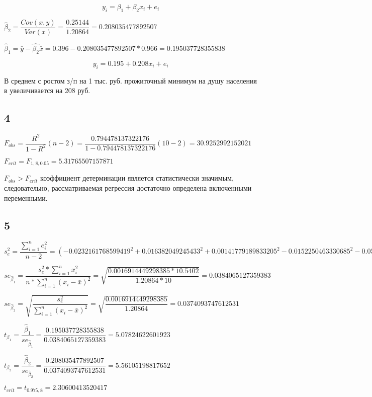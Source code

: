 \documentclass[12pt,a4paper, oneside]{extreport}
\begin{document}
$$y_i = \beta_1 + \beta_2 x_i + e_i  $$


$\hat{\beta}_2 = \dfrac{Cov(x,y)}{Var(x)} = \dfrac{0.25144}{1.20864} = 0.208035477892507 $


$\hat{\beta}_1 = \bar{y} - \hat{\beta_2}  \bar{x}  = 0.396 -  0.208035477892507 * 0.966 =  0.195037728355838$


$$y_i = 0.195 + 0.208 x_i + e_i  $$

В среднем с ростом з/п на 1 тыс. руб. прожиточный минимум на душу населения в увеличивается на 208 руб.


\subsection*{4}

$F_{obs} = \dfrac{R^2}{1-R^2} (n-2) = \dfrac{0.794478137322176}{1-0.794478137322176} (10-2) = 30.9252992152021$

$F_{crit} = F_{1, 8, 0.05}  = 5.31765507157871$

$F_{obs} > F_{crit}$ коэффициент детерминации является статистически значимым, следовательно, рассматриваемая регрессия достаточно определена включенными переменными.  

\subsection*{5}

$s^2_{e} = \dfrac{\sum^n_{i=1}e_i^2}{n-2}=({-0.0232161768599419 }^2+{ 0.016382049245433 }^2+{ 0.00141779189833205 }^2-{ 0.0152250463330685 }^2-{ 0.0522696584590945 }^2-{ 0.01683214191157 }^2+{ 0.0486053746359545 }^2+{ 0.0702839555202541 }^2+{ 0.0149894095843262 }^2-{ 0.0441355573206249 }^2):8 = 0.0016914449298385$

$se_{\hat{\beta}_1} = \dfrac{s^2_e * \sum_{i=1}^n x_i^2 }{n* \sum_{i=1}^n (x_i-\bar{x})^2 }	= \sqrt{\dfrac{0.0016914449298385 * 10.5402}{1.20864 * 10} }= 0.0384065127359383 $

$se_{\hat{\beta}_2} = \sqrt{\dfrac{s^2_e}{\sum_{i=1}^n (x_i-\bar{x})^2 }}= \sqrt{\dfrac{0.0016914449298385}{1.20864}} = 0.0374093747612531 $

$t_{\beta_1} = \dfrac{\hat{\beta}_1}{se_{\hat{\beta}_1}} = \dfrac{0.195037728355838}{0.0384065127359383} = 5.07824622601923$

$t_{\beta_2} = \dfrac{\hat{\beta}_2}{se_{\hat{\beta}_2}} = \dfrac{0.208035477892507}{0.0374093747612531} = 5.56105198817652$

$t_{crit} = t_{0.975, 8} =  2.30600413520417 $
\end{document}
